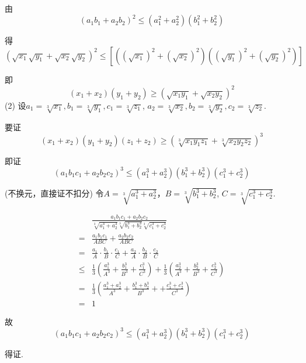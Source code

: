 \documentclass[cs4size,windows,a4paper,answers]{BHCexam}
\begin{document}
\begin{groups}
\begin{questions}[s]
\begin{solution}
由\[ (a_1b_1+a_2b_2)^2 \le  (a_1^2+a_2^2)(b_1^2+b_2^2)\]

得\[ (\sqrt{x_1}\sqrt{y_1}+\sqrt{x_2}\sqrt{y_2})^2 \le  [((\sqrt{x_1})^2+(\sqrt{x_2})^2)((\sqrt{y_1})^2+(\sqrt{y_2})^2)]\]

即\[
(x_1+x_2)(y_1+y_2) \ge (\sqrt{x_1y_1}+\sqrt{x_2y_2})^2
\]
(2) 设$a_1=\sqrt[3]{x_1}, b_1=\sqrt[3]{y_1}, c_1=\sqrt[3]{z_1}$, $a_2=\sqrt[3]{x_2}, b_2=\sqrt[3]{y_2}, c_2=\sqrt[3]{z_2}$.

要证
\[
(x_1+x_2)(y_1+y_2)(z_1+z_2) \ge (\sqrt[3]{x_1y_1z_1}+\sqrt[3]{x_2y_2z_2})^3
\]

即证
\[
(a_1b_1c_1+a_2b_2c_2)^3 \le  (a_1^3+a_2^3)(b_1^3+b_2^3)(c_1^3+c_2^3)
\]

(不换元，直接证不扣分)
令$A=\sqrt[3]{a_1^3+a_2^3}$，$B=\sqrt[3]{b_1^3+b_2^3}$, $C=\sqrt[3]{c_1^3+c_2^3}$.

\[
\begin{array}{rl}
& \frac{a_1b_1c_1+a_2b_2c_2}{\sqrt[3]{a_1^3+a_2^3}\sqrt[3]{b_1^3+b_2^3}\sqrt[3]{c_1^3+c_2^3}}\\
= & \frac{a_1b_1c_1}{ABC}+\frac{a_2b_2c_2}{ABC}\\
= & \frac{a_1}{A}\cdot\frac{b_1}{B}\cdot\frac{c_1}{C}+\frac{a_2}{A}\cdot\frac{b_2}{B}\cdot\frac{c_2}{C}\\
\le & \frac{1}{3}(\frac{a_1^3}{A^3}+\frac{b_1^3}{B^3}+\frac{c_1^3}{C^3})+ \frac{1}{3}(\frac{a_2^3}{A^3}+\frac{b_2^3}{B^3}+\frac{c_2^3}{C^3})\\
= & \frac{1}{3}(\frac{a_1^3+a_2^3}{A^3}+\frac{b_1^3+b_2^3}{B^3}++\frac{c_1^3+c_2^3}{C^3})\\
= & 1
\end{array}
\]

故\[(a_1b_1c_1+a_2b_2c_2)^3 \le  (a_1^3+a_2^3)(b_1^3+b_2^3)(c_1^3+c_2^3)\]

得证.


\end{solution}
\end{questions}
\end{groups}
\end{document}
